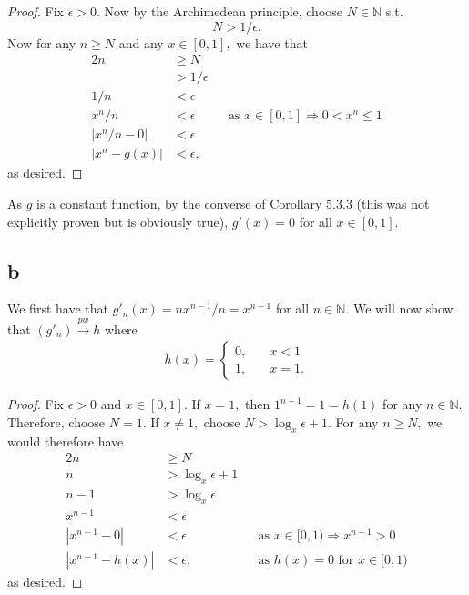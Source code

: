 \documentclass[10pt]{article}
\begin{document}
\begin{proof}
    Fix $\epsilon>0.$ Now by the Archimedean principle, choose $N\in\mathbb{N}$ s.t.
    \[N>1/\epsilon.\]
    Now for any $n\ge N$ and any $x\in[0,1],$ we have that
    \begin{alignat*}{2}
        n &\ge N\\
        &>1/\epsilon\\
        1/n &<\epsilon\\
        x^n/n & <\epsilon \quad&& \text{as $x\in[0,1]\Rightarrow 0< x^n\le 1$}\\
        |x^n/n - 0| & <\epsilon\\
        |x^n-g(x)| & <\epsilon,
    \end{alignat*}
    as desired.
\end{proof}

As $g$ is a constant function, by the converse of Corollary 5.3.3 (this was not explicitly proven but is obviously true), $g'(x)=0$ for all $x\in[0,1].$
\subsection*{b}

We first have that $g'_n(x)=nx^{n-1}/n = x^{n-1}$ for all $n\in\mathbb{N}.$ We will now show that $(g'_n)\stackrel{pw}{\to}h$ where
\begin{align*}
    h(x)=\begin{cases}
        0,\quad&x<1\\
        1,&x=1.
    \end{cases}
\end{align*}

\begin{proof}
    Fix $\epsilon > 0$ and $x\in[0,1].$ If $x=1,$ then $1^{n-1}=1=h(1)$ for any $n\in\mathbb{N}.$ Therefore, choose $N=1.$ If $x\neq 1,$ choose $N>\log_x \epsilon+1.$ For any $n\ge N,$ we would therefore have
    \begin{alignat*}{2}
        n &\ge N\\
        n &> \log_x \epsilon+1\\
        n-1 &> \log_x \epsilon\\
        x^{n-1}&< \epsilon\\
        |x^{n-1}-0| &< \epsilon \quad&&\text{as $x\in[0,1)\Rightarrow x^{n-1}>0$}\\
        |x^{n-1}-h(x)| &<\epsilon, &&\text{as $h(x)=0$ for $x\in[0,1)$} 
    \end{alignat*}
    as desired.
\end{proof}
\end{document}

